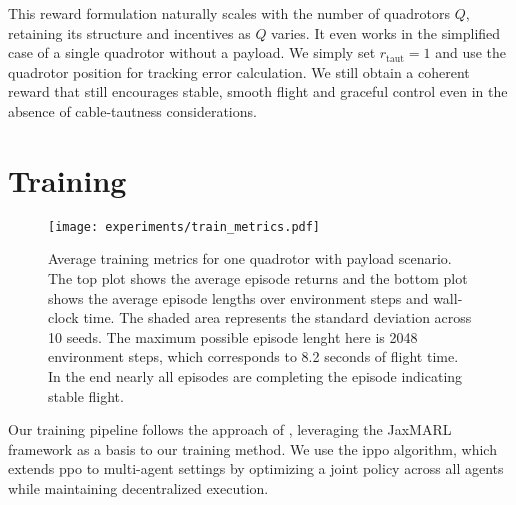 This reward formulation naturally scales with the number of quadrotors \(Q\), retaining its structure and incentives as \(Q\) varies. It even works in the simplified case of a single quadrotor without a payload. We simply set \(r_{\mathrm{taut}}=1\) and use the quadrotor position for tracking error calculation. We still obtain a coherent reward that still encourages stable, smooth flight and graceful control even in the absence of cable-tautness considerations.





\section{Training}
\begin{figure}[ht]
    \centering
    
    \texttt{[image: experiments/train\_metrics.pdf]}
    \caption[Training metrics]{Average training metrics for one quadrotor with payload scenario. The top plot shows the average episode returns and the bottom plot shows the average episode lengths over environment steps and wall-clock time. The shaded area represents the standard deviation across 10 seeds. The maximum possible episode lenght here is 2048 environment steps, which corresponds to 8.2 seconds of flight time. In the end nearly all episodes are completing the episode indicating stable flight.}
    \label{fig:train_metrics}
\end{figure}
Our training pipeline follows the approach of \autocite{flair2023jaxmarl}, leveraging the JaxMARL framework as a basis to our training method. We use the \gls{ippo} algorithm, which extends \gls{ppo} to multi-agent settings by optimizing a joint policy across all agents while maintaining decentralized execution.

